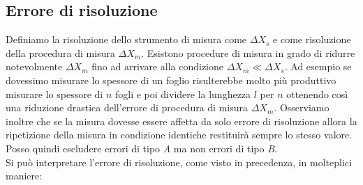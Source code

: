 \documentclass[11pt,a4paper]{book}
\begin{document}
\subsection{Errore di risoluzione} \label{1.3.1 definizione di risoluzione di misura} 
Definiamo la risoluzione dello strumento di misura come $ \Delta X_s $ e come risoluzione della procedura di misura $ \Delta X_m $. Esistono procedure di misura in grado di ridurre notevolmente $ \Delta X_m $ fino ad arrivare alla condizione $ \Delta X_m \ll \Delta X_s $. Ad esempio se dovessimo misurare lo spessore di un foglio risulterebbe molto più produttivo misurare lo spessore di $ n $ fogli e poi dividere la lunghezza $ l $ per $ n $ ottenendo così una riduzione drastica dell'errore di procedura di misura $ \Delta X_m $. Osserviamo inoltre che se la misura dovesse essere affetta da solo errore di risoluzione allora la ripetizione della misura in condizione identiche restituirà sempre lo stesso valore. Posso quindi escludere errori di tipo \textit{A} ma non errori di tipo \textit{B}. \\
Si può interpretare l'errore di risoluzione, come visto in precedenza, in molteplici maniere:
\end{document}
